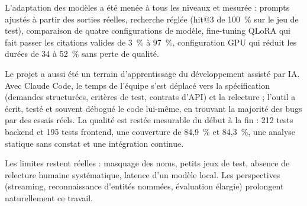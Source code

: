 \documentclass[12pt,a4paper]{report}
\begin{document}
L'adaptation des modèles a été menée à tous les niveaux et mesurée : prompts ajustés à partir des sorties
réelles, recherche réglée (hit@3 de 100~\% sur le jeu de test), comparaison de quatre configurations de
modèle, fine-tuning QLoRA qui fait passer les citations valides de 3~\% à 97~\%, configuration GPU qui
réduit les durées de 34 à 52~\% sans perte de qualité.

Le projet a aussi été un terrain d'apprentissage du développement assisté par IA. Avec Claude Code, le
temps de l'équipe s'est déplacé vers la spécification (demandes structurées, critères de test, contrats
d'API) et la relecture ; l'outil a écrit, testé et souvent débogué le code lui-même, en trouvant la
majorité des bugs par des essais réels. La qualité est restée mesurable du début à la fin : 212 tests
backend et 195 tests frontend, une couverture de 84,9~\% et 84,3~\%, une analyse statique sans constat et
une intégration continue.

Les limites restent réelles : masquage des noms, petits jeux de test, absence de relecture humaine
systématique, latence d'un modèle local. Les perspectives (streaming, reconnaissance d'entités nommées,
évaluation élargie) prolongent naturellement ce travail.
\end{document}
